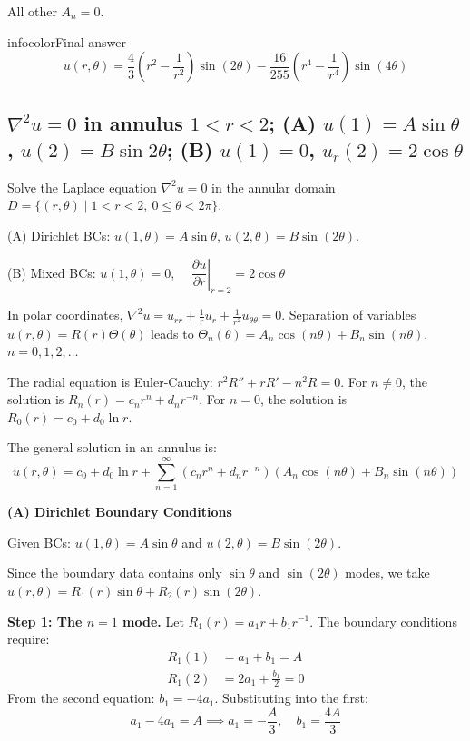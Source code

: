\documentclass[a4paper,11pt]{article} %
\newenvironment{summarybox}[1][]{\begin{custombox}[#1]{infocolor}{Final answer}}{\end{custombox}}
\begin{document}
All other $A_n = 0$.

\begin{summarybox}
$$ u(r, \theta) = \frac{4}{3}\left(r^2 - \frac{1}{r^2}\right)\sin(2\theta) - \frac{16}{255}\left(r^4 - \frac{1}{r^4}\right)\sin(4\theta) $$
\end{summarybox}

\newpage
\subsection{\texorpdfstring{$\nabla^2 u = 0$ in annulus $1<r<2$; (A) $u(1)=A\sin\theta$, $u(2)=B\sin 2\theta$; (B) $u(1)=0$, $u_r(2)=2\cos\theta$}{Laplace in full annulus: (A) two-mode Dirichlet BCs; (B) mixed Dirichlet--Neumann BCs}}

\begin{problembox}
Solve the Laplace equation $\nabla^2 u = 0$ in the annular domain $D = \{ (r, \theta) \mid 1 < r < 2, \ 0 \le \theta < 2\pi \}$.

(A) Dirichlet BCs: $u(1, \theta) = A\sin\theta$, \quad $u(2, \theta) = B\sin(2\theta)$.

(B) Mixed BCs: $u(1,\theta) = 0$, $\quad \left. \dfrac{\partial u}{\partial r} \right|_{r=2} = 2\cos\theta$
\end{problembox}
In polar coordinates, $\nabla^2 u = u_{rr} + \frac{1}{r}u_r + \frac{1}{r^2}u_{\theta\theta} = 0$.
Separation of variables $u(r,\theta) = R(r)\Theta(\theta)$ leads to $\Theta_n(\theta) = A_n\cos(n\theta) + B_n\sin(n\theta)$, $n = 0,1,2,\dots$

The radial equation is Euler-Cauchy: $r^2 R'' + r R' - n^2 R = 0$.
For $n \neq 0$, the solution is $R_n(r) = c_n r^n + d_n r^{-n}$.
For $n = 0$, the solution is $R_0(r) = c_0 + d_0 \ln r$.

The general solution in an annulus is:
$$ u(r, \theta) = c_0 + d_0 \ln r + \sum_{n=1}^{\infty} \left( c_n r^n + d_n r^{-n} \right) (A_n \cos(n\theta) + B_n \sin(n\theta)) $$

\textbf{(A) Dirichlet Boundary Conditions}

Given BCs: $u(1, \theta) = A\sin\theta$ and $u(2, \theta) = B\sin(2\theta)$.

Since the boundary data contains only $\sin\theta$ and $\sin(2\theta)$ modes, we take $u(r, \theta) = R_1(r)\sin\theta + R_2(r)\sin(2\theta)$.

\textbf{Step 1: The $n=1$ mode.}
Let $R_1(r) = a_1 r + b_1 r^{-1}$. The boundary conditions require:
\begin{align*}
    R_1(1) &= a_1 + b_1 = A \\
    R_1(2) &= 2a_1 + \frac{b_1}{2} = 0
\end{align*}
From the second equation: $b_1 = -4a_1$. Substituting into the first:
$$ a_1 - 4a_1 = A \implies a_1 = -\frac{A}{3}, \quad b_1 = \frac{4A}{3} $$
\end{document}
